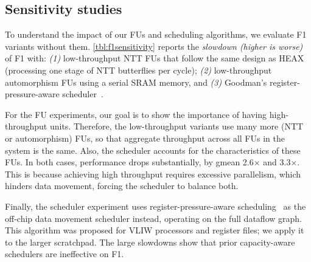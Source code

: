 
\subsection{Sensitivity studies}
\label{sec:sensitivity}

\tblFOneSensitivity

To understand the impact of our FUs and scheduling algorithms, we evaluate F1 variants without them.
\autoref{tbl:f1sensitivity} reports the \emph{slowdown (higher is worse)} of F1 with:
\emph{(1)} low\hyp{}throughput NTT FUs that follow the same design as HEAX
(processing one stage of NTT butterflies per cycle); %
\emph{(2)} low\hyp{}throughput automorphism FUs using a serial SRAM memory,
and \emph{(3)} Goodman's register-pressure-aware scheduler~\cite{goodman:ics1988:code}.

For the FU experiments, our goal is to show the importance of having high-throughput units.
Therefore, the low-throughput variants use many more (NTT or automorphism) FUs,
so that aggregate throughput across all FUs in the system is the same.
Also, the scheduler accounts for the characteristics of these FUs.
In both cases, performance drops substantially, by gmean 2.6$\times$ and 3.3$\times$.
This is because achieving high throughput requires excessive parallelism,
which hinders data movement, forcing the scheduler to balance both.



Finally, the scheduler experiment uses register-pressure-aware scheduling~\cite{goodman:ics1988:code}
as the off-chip data movement scheduler instead, operating on the full dataflow graph.
This algorithm was proposed for VLIW processors and register files; we apply it to the larger scratchpad.
The large slowdowns show that prior capacity-aware schedulers are ineffective on F1.


